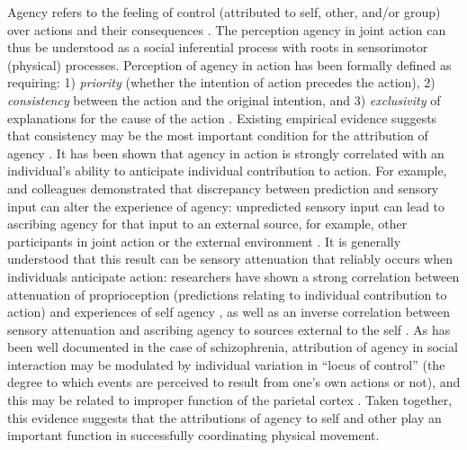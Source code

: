 \begin{CJK}{UTF8}{gbsn}
  Agency refers to the feeling of control (attributed to self, other, and/or group) over actions and their consequences \citep{Moore2016}.  The perception agency in joint action can thus be understood as a social inferential process with roots in sensorimotor (physical) processes.  Perception of agency in action has been formally defined as requiring: 1) \textit{priority} (whether the intention of action precedes the action), 2) \textit{consistency} between the action and the original intention, and 3) \textit{exclusivity} of explanations for the cause of the action \citep{Wegner1999}.  Existing empirical evidence suggests that consistency may be the most important condition for the attribution of agency \citep{VanderWel2012}.  It has been shown that agency in action is strongly correlated with an individual's ability to anticipate individual contribution to action.  For example, \textcite{Sato2008} and colleagues demonstrated that discrepancy between prediction and sensory input can alter the experience of agency: unpredicted sensory input can lead to ascribing agency for that input to an external source, for example, other participants in joint action or the external environment \citep{Sato2005,Frith2007}.  It is generally understood that this result can be sensory attenuation that reliably occurs when individuals anticipate action:  researchers have shown a strong correlation between attenuation of proprioception (predictions relating to individual contribution to action) and experiences of self agency \citep{Wolpert2003,Sato2008}, as well as an inverse correlation between sensory attenuation and ascribing agency to sources external to the self \citep{Brown2013}.  As has been well documented in the case of schizophrenia, attribution of agency in social interaction may be modulated by individual variation in ``locus of control'' (the degree to which events are perceived to result from one’s own actions or not), and this may be related to improper function of the parietal cortex \citep{Frith2000}.  Taken together, this evidence suggests that the attributions of agency to self and other play an important function in successfully coordinating physical movement.


\end{CJK}
